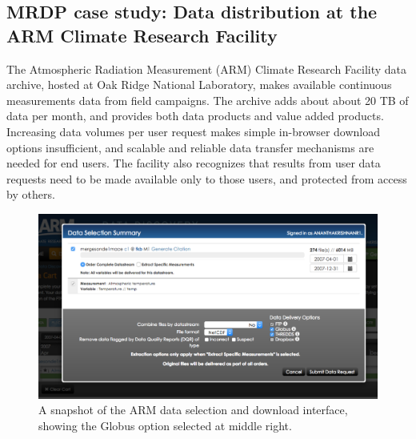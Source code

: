 \documentclass[10pt]{article}
\begin{document}
%

\subsection*{MRDP case study: Data distribution at the ARM Climate Research Facility} 

The Atmospheric Radiation Measurement (ARM) Climate Research Facility data archive, hosted at Oak Ridge National Laboratory, makes available continuous measurements data from field campaigns. 
The archive adds about about 20 TB of data per month, 
and provides both data products and value added products. 
Increasing data volumes per user request makes simple in-browser download options insufficient, and scalable and reliable data transfer mechanisms are needed for end users. 
The facility also recognizes that results from user data requests need to be made available only to those users, and protected from access by others. 

\begin{figure}

    \vspace{-2ex}

    \centering
    \includegraphics[trim=0.63in 0.45in 0.31in 0.26in,clip,width=0.62\columnwidth]{Figures/ARM.png}
    
    \vspace{1ex}
    
    \caption{A snapshot of the ARM data selection and download interface, 
    showing the Globus option selected at middle right. 
    \label{fig:ARM}}
\end{figure}
\end{document}
